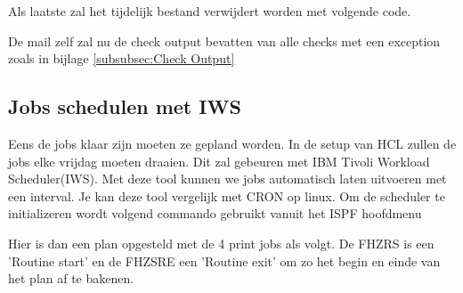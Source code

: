 
Als laatste zal het tijdelijk bestand verwijdert worden met volgende code.


De mail zelf zal nu de check output bevatten van alle checks met een exception zoals in bijlage \ref{subsubsec:Check Output}

\subsection{Jobs schedulen met IWS}
\label{subsec:Jobs schedulen met IWS}

Eens de jobs klaar zijn moeten ze gepland worden. In de setup van HCL zullen de jobs elke vrijdag moeten draaien. Dit zal gebeuren met IBM Tivoli Workload Scheduler(IWS). Met deze tool kunnen we jobs automatisch laten uitvoeren met een interval. Je kan deze tool vergelijk met CRON op linux. Om de scheduler te initializeren wordt volgend commando gebruikt vanuit het ISPF hoofdmenu


Hier is dan een plan opgesteld met de 4 print jobs als volgt. De FHZRS is een 'Routine start' en de FHZSRE een 'Routine exit' om zo het begin en einde van het plan af te bakenen. 

